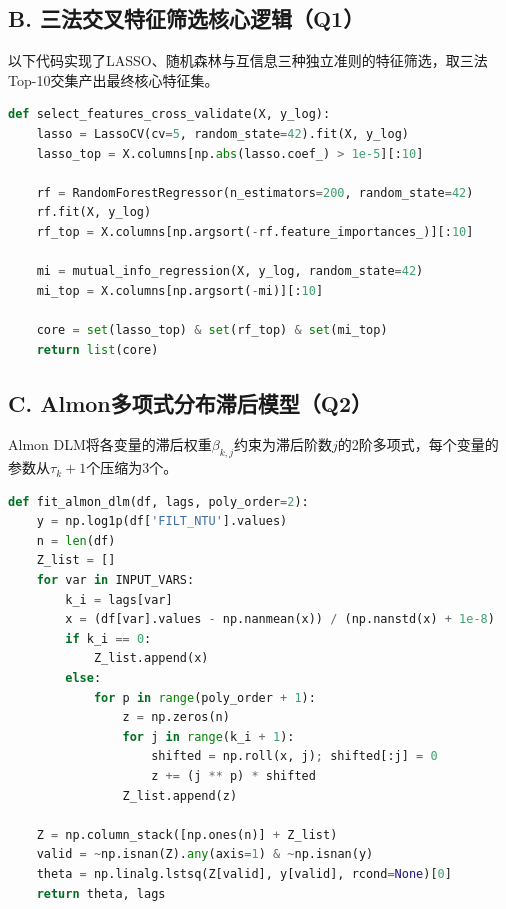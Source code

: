 \documentclass{cumcmthesis}
\begin{document}
\subsection*{B. 三法交叉特征筛选核心逻辑（Q1）}
以下代码实现了LASSO、随机森林与互信息三种独立准则的特征筛选，取三法Top-10交集产出最终核心特征集。

\begin{lstlisting}[language=python, caption={三法交叉特征筛选}, label={lst:feature}]
def select_features_cross_validate(X, y_log):
    lasso = LassoCV(cv=5, random_state=42).fit(X, y_log)
    lasso_top = X.columns[np.abs(lasso.coef_) > 1e-5][:10]

    rf = RandomForestRegressor(n_estimators=200, random_state=42)
    rf.fit(X, y_log)
    rf_top = X.columns[np.argsort(-rf.feature_importances_)][:10]

    mi = mutual_info_regression(X, y_log, random_state=42)
    mi_top = X.columns[np.argsort(-mi)][:10]

    core = set(lasso_top) & set(rf_top) & set(mi_top)
    return list(core)
\end{lstlisting}

\subsection*{C. Almon多项式分布滞后模型（Q2）}
Almon DLM将各变量的滞后权重$\beta_{k,j}$约束为滞后阶数$j$的2阶多项式，每个变量的参数从$\tau_k+1$个压缩为3个。

\begin{lstlisting}[language=python, caption={Almon多项式分布滞后模型参数估计}, label={lst:almon}]
def fit_almon_dlm(df, lags, poly_order=2):
    y = np.log1p(df['FILT_NTU'].values)
    n = len(df)
    Z_list = []
    for var in INPUT_VARS:
        k_i = lags[var]
        x = (df[var].values - np.nanmean(x)) / (np.nanstd(x) + 1e-8)
        if k_i == 0:
            Z_list.append(x)
        else:
            for p in range(poly_order + 1):
                z = np.zeros(n)
                for j in range(k_i + 1):
                    shifted = np.roll(x, j); shifted[:j] = 0
                    z += (j ** p) * shifted
                Z_list.append(z)

    Z = np.column_stack([np.ones(n)] + Z_list)
    valid = ~np.isnan(Z).any(axis=1) & ~np.isnan(y)
    theta = np.linalg.lstsq(Z[valid], y[valid], rcond=None)[0]
    return theta, lags
\end{lstlisting}
\end{document}
